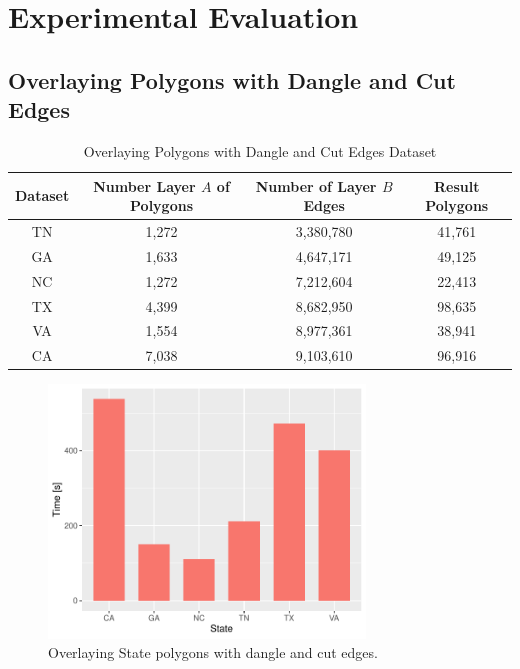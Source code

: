 \section{Experimental Evaluation} \label{sec:extension_experiments}

\subsection{Overlaying Polygons with Dangle and Cut Edges}

\begin{table}
    \small
    \caption{Overlaying Polygons with Dangle and Cut Edges Dataset}
    \label{tab:dangles}
    \begin{tabular}{c c c c}
        \toprule
        Dataset & Number Layer $A$ of Polygons & Number of Layer $B$ Edges & Result Polygons \\
        \midrule
        TN & 1,272 & 3,380,780 & 41,761 \\
        GA & 1,633 & 4,647,171 & 49,125 \\
        NC & 1,272 & 7,212,604 & 22,413 \\
        TX & 4,399  & 8,682,950 & 98,635 \\
        VA & 1,554 & 8,977,361 & 38,941 \\
        CA & 7,038 & 9,103,610 & 96,916\\
        \bottomrule
    \end{tabular}
\end{table}

\begin{figure}
    \centering
    \includegraphics[width=0.75\textwidth]{chapterExtension/states.pdf}
    \caption{Overlaying State polygons with dangle and cut edges.}
    \label{fig:dangle}
\end{figure}

